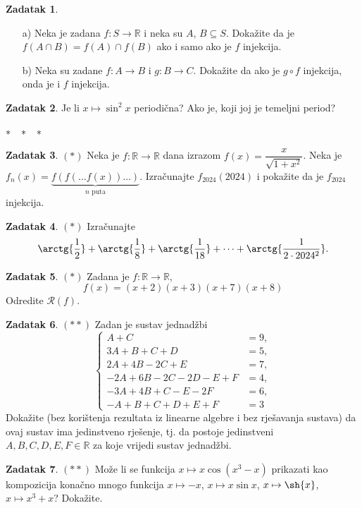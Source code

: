 \documentclass{book}
\theoremstyle{definition}
\theoremstyle{definition}
\newtheorem{exercise}{Zadatak}
\theoremstyle{remark}
\begin{document}
\begin{exercise} \textbf{}
\begin{itemize}
\item[a)] Neka je zadana $f : S\to \mathbb{R}$ i neka su $A$, $B\subseteq S$. Dokažite da je $f(A\cap B)=f(A)\cap f(B)$ ako i samo ako je $f$ injekcija.
\item[b)] Neka su zadane $f : A\to B$ i $g : B\to C$. Dokažite da ako je $g\circ f$ injekcija, onda je i $f$ injekcija.
\end{itemize}
\end{exercise}
\begin{exercise}
Je li $x\mapsto \sin^2{x}$ periodična? Ako je, koji joj je temeljni period?
\end{exercise}
\begin{center}
$*\hspace{0.3cm}*\hspace{0.3cm}*\hspace{0.3cm}$
\end{center}
\begin{exercise} $(*)$
Neka je $f : \mathbb{R}\to \mathbb{R}$ dana izrazom $f(x)=\dfrac{x}{\sqrt{1+x^2}}$. Neka je $f_n(x)=\underbrace{f(f(\dots f(x))\dots)}_\text{$n$ puta}$. Izračunajte $f_{2024}(2024)$ i pokažite da je $f_{2024}$ injekcija.
\end{exercise}
\begin{exercise} $(*)$ Izračunajte
$$\arctg{\dfrac{1}{2}}+\arctg{\dfrac{1}{8}}+\arctg{\dfrac{1}{18}}+\dots+ \arctg{\dfrac{1}{2\cdot 2024^2}}.$$
\end{exercise}
\begin{exercise} $(*)$
Zadana je $f : \mathbb{R}\to \mathbb{R}$,
$$f(x)=(x+2)(x+3)(x+7)(x+8)$$
Odredite $\mathcal{R}(f)$.
\end{exercise}
\begin{exercise} $(**)$ \textbf{}
Zadan je sustav jednadžbi
$$\begin{cases}
A + C&=9,\\
 3A + B + C + D&=5,\\
 2A + 4B - 2C + E&=7,\\
 -2A + 6B - 2C - 2D - E + F&=4,\\
 -3A + 4B + C - E - 2F&=6,\\
 -A + B + C + D + E + F&=3
   \end{cases}$$
Dokažite (bez korištenja rezultata iz linearne algebre i bez rješavanja sustava) da ovaj sustav ima jedinstveno rješenje, tj. da postoje jedinstveni $A, B, C, D, E, F\in \mathbb{R}$ za koje vrijedi sustav jednadžbi.
\end{exercise}
\begin{exercise} $(**)$
Može li se funkcija $x\mapsto x\cos(x^3-x)$ prikazati kao kompozicija konačno mnogo funkcija $x\mapsto -x$, $x\mapsto x\sin{x}$, $x\mapsto \sh{x}$, $x\mapsto x^3+x$? Dokažite.
\end{exercise}
\end{document}
